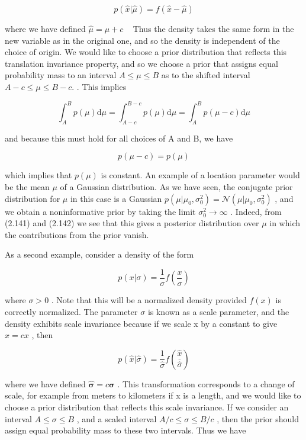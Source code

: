 \documentclass[
  10
]{article}
\begin{document}
\[
p (\widehat {x} | \widehat {\mu}) = f (\widehat {x} - \widehat {\mu})\tag{2.233}
\]

where we have defined \({ \widehat { \mu } } = \mu + c\)   Thus the
density takes the same form in the new variable as in the original one,
and so the density is independent of the choice of origin. We would like
to choose a prior distribution that reflects this translation invariance
property, and so we choose a prior that assigns equal probability mass
to an interval \(A \leqslant \mu \leqslant B\) as to the shifted
interval \(A - c \leqslant \mu \leqslant B - c .\) . This implies

\[
\int_ {A} ^ {B} p (\mu) \mathrm{d} \mu = \int_ {A - c} ^ {B - c} p (\mu) \mathrm{d} \mu = \int_ {A} ^ {B} p (\mu - c) \mathrm{d} \mu\tag{2.234}
\]

and because this must hold for all choices of A and B, we have

\[
p (\mu - c) = p (\mu)\tag{2.235}
\]

which implies that \(p ( \mu )\) is constant. An example of a location
parameter would be the mean \(\mu\) of a Gaussian distribution. As we
have seen, the conjugate prior distribution for \(\mu\) in this case is
a Gaussian
\(p ( \mu | \mu _ { 0 } , \sigma _ { 0 } ^ { 2 } ) = \mathcal { N } ( \mu | \mu _ { 0 } , \sigma _ { 0 } ^ { 2 } )\)
, and we obtain a noninformative prior by taking the limit
\(\sigma _ { 0 } ^ { 2 } \to \infty\) . Indeed, from (2.141) and (2.142)
we see that this gives a posterior distribution over \(\mu\) in which
the contributions from the prior vanish.

As a second example, consider a density of the form

\[
p (x | \sigma) = \frac {1}{\sigma} f \left(\frac {x}{\sigma}\right)\tag{2.236}
\]

where \(\sigma > 0\) . Note that this will be a normalized density
provided \(f ( x )\) is correctly normalized. The parameter \(\sigma\)
is known as a scale parameter, and the density exhibits scale invariance
because if we scale x by a constant to give \({ \widehat { x } } = c x\)
, then

\[
p (\widehat {x} | \widehat {\sigma}) = \frac {1}{\widehat {\sigma}} f \binom{\widehat {x}}{\overline {{\widehat {\sigma}}}}\tag{2.237}
\]

where we have defined
\(\widehat { \boldsymbol { \sigma } } = c \boldsymbol { \sigma }\) .
This transformation corresponds to a change of scale, for example from
meters to kilometers if x is a length, and we would like to choose a
prior distribution that reflects this scale invariance. If we consider
an interval \(A \leqslant \sigma \leqslant B\) , and a scaled interval
\(A / c \leqslant \sigma \leqslant B / c\) , then the prior should
assign equal probability mass to these two intervals. Thus we have
\end{document}
